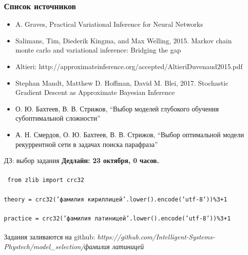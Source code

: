 \documentclass[usenames,dvipsnames,10pt,pdf,utf8,russian,aspectratio=43]{beamer}
\begin{document}
\begin{frame}
\frametitle{Список источников}
\begin{itemize}
\item A. Graves, Practical Variational Inference for Neural Networks
\item Salimans, Tim, Diederik Kingma, and Max Welling, 2015. Markov chain monte carlo and variational inference: Bridging the gap
\item Altieri: http://approximateinference.org/accepted/AltieriDuvenaud2015.pdf
\item Stephan Mandt, Matthew D. Hoffman, David M. Blei, 2017. Stochastic Gradient Descent as Approximate Bayesian Inference
\item О. Ю. Бахтеев, В. В. Стрижов, “Выбор моделей глубокого обучения субоптимальной сложности”
\item А. Н. Смердов, О. Ю. Бахтеев, В. В. Стрижов, “Выбор оптимальной модели рекуррентной сети в задачах поиска парафраза”
\end{itemize}
\end{frame}

\begin{frame}{ДЗ: выбор задания}
\textbf{Дедлайн: 23 октября, 0 часов.}\\~\\

\texttt{ from zlib import crc32}\\~\\
\texttt{theory = crc32('фамилия кириллицей'.lower().encode('utf-8'))\%3+1}\\~\\
\texttt{practice = crc32('фамилия латиницей'.lower().encode('utf-8'))\%3+1}\\~\\

Задания заливаются на github:
\textit{https://github.com/Intelligent-Systems-Phystech/model\_selection/фамилия латиницей}\\

\end{frame}
\end{document}
